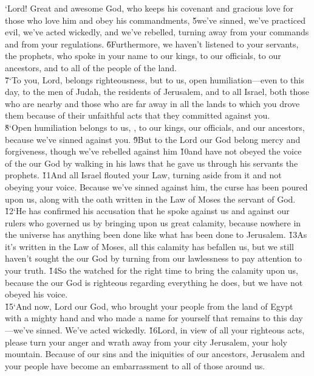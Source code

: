 \begin{poetry}
\poeml `Lord! Great and awesome God, who keeps his covenant and gracious love for those who love him and obey his commandments, \v{5}we've sinned, we've practiced evil, we've acted wickedly, and we've rebelled, turning away from your commands and from your regulations. \v{6}Furthermore, we haven't listened to your servants, the prophets, who spoke in your name to our kings, to our officials, to our ancestors, and to all of the people of the land. \\
\poeml \v{7}`To you, Lord, belongs righteousness, but to us, open humiliation---even to this day, to the men of Judah, the residents of Jerusalem, and to all Israel, both those who are nearby and those who are far away in all the lands to which you drove them because of their unfaithful acts that they committed against you. \\
\poeml \v{8}`Open humiliation belongs to us, , to our kings, our officials, and our ancestors, because we've sinned against you. \v{9}But to the Lord our God belong mercy and forgiveness, though we've rebelled against him \v{10}and have not obeyed the voice of the  our God by walking in his laws that he gave us through his servants the prophets. \v{11}And all Israel flouted your Law, turning aside from it and not obeying your voice. Because we've sinned against him, the curse has been poured upon us, along with the oath written in the Law of Moses the servant of God. \\
\poeml \v{12}`He has confirmed his accusation that he spoke against us and against our rulers who governed us by bringing upon us great calamity, because nowhere in the universe has anything been done like what has been done to Jerusalem. \v{13}As it's written in the Law of Moses, all this calamity has befallen us, but we still haven't sought the  our God by turning from our lawlessness to pay attention to your truth. \v{14}So the  watched for the right time to bring the calamity upon us, because the  our God is righteous regarding everything he does, but we have not obeyed his voice. \\
\poeml \v{15}`And now, Lord our God, who brought your people from the land of Egypt with a mighty hand and who made a name for yourself that remains to this day---we've sinned. We've acted wickedly. \v{16}Lord, in view of all your righteous acts, please turn your anger and wrath away from your city Jerusalem, your holy mountain. Because of our sins and the iniquities of our ancestors, Jerusalem and your people have become an embarrassment to all of those around us. \\

\end{poetry}
